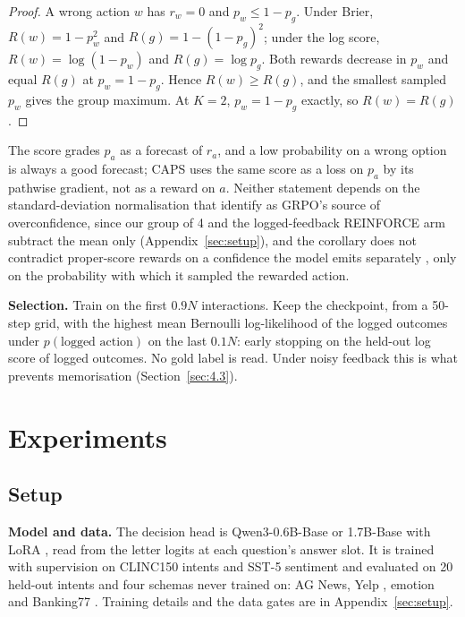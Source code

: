 \documentclass[10pt,letterpaper]{article}
\theoremstyle{plain}
\begin{document}
\begin{proof}
A wrong action $w$ has $r_w = 0$ and $p_w \le 1 - p_g$. Under Brier, $R(w) = 1 - p_w^2$ and $R(g) = 1 - (1 - p_g)^2$; under the log score, $R(w) = \log(1 - p_w)$ and $R(g) = \log p_g$. Both rewards decrease in $p_w$ and equal $R(g)$ at $p_w = 1 - p_g$. Hence $R(w) \ge R(g)$, and the smallest sampled $p_w$ gives the group maximum. At $K = 2$, $p_w = 1 - p_g$ exactly, so $R(w) = R(g)$.
\end{proof}

The score grades $p_a$ as a forecast of $r_a$, and a low probability on a wrong option is always a good forecast; CAPS uses the same score as a loss on $p_a$ by its pathwise gradient, not as a reward on $a$. Neither statement depends on the standard-deviation normalisation that \citet{bereket2025uncalibrated} identify as GRPO's source of overconfidence, since our group of 4 and the logged-feedback REINFORCE arm subtract the mean only (Appendix~\ref{sec:setup}), and the corollary does not contradict proper-score rewards on a confidence the model emits separately \citep{damani2025rlcr,bereket2025uncalibrated}, only on the probability with which it sampled the rewarded action.

\textbf{Selection.} Train on the first $0.9N$ interactions. Keep the checkpoint, from a 50-step grid, with the highest mean Bernoulli log-likelihood of the logged outcomes under $p(\text{logged action})$ on the last $0.1N$: early stopping on the held-out log score of logged outcomes. No gold label is read. Under noisy feedback this is what prevents memorisation (Section~\ref{sec:4.3}).

\section{Experiments}\label{sec:4}

\subsection{Setup}\label{sec:4.1}

\textbf{Model and data.} The decision head is Qwen3-0.6B-Base or 1.7B-Base with LoRA \citep{hu2022lora,qwen2025qwen3}, read from the letter logits at each question's answer slot. It is trained with supervision on CLINC150 intents \citep{larson2019clinc} and SST-5 sentiment \citep{socher2013sst} and evaluated on 20 held-out intents and four schemas never trained on: AG News, Yelp \citep{zhang2015charcnn}, emotion \citep{saravia2018carer} and Banking77 \citep{casanueva2020banking77}. Training details and the data gates are in Appendix~\ref{sec:setup}.
\end{document}
